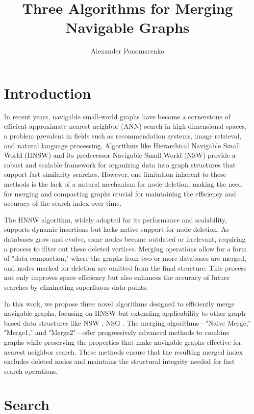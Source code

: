 \documentclass{article}
\title{Three Algorithms for Merging Navigable Graphs}
\author[1]{Alexander Ponomarenko}
\date{}
\affil[1]{YugaByte LLC}
\begin{document}
\maketitle

\section{Introduction}
In recent years, navigable small-world graphs have become a cornerstone of efficient approximate nearest neighbor (ANN) search in high-dimensional spaces, a problem prevalent in fields such as recommendation systems, image retrieval, and natural language processing. Algorithms like Hierarchical Navigable Small World (HNSW) \cite{hnsw} and its predecessor Navigable Small World (NSW) \cite{nsw2011,nsw2012,nsw2014} provide a robust and scalable framework for organizing data into graph structures that support fast similarity searches. However, one limitation inherent to these methods is the lack of a natural mechanism for node deletion, making the need for merging and compacting graphs crucial for maintaining the efficiency and accuracy of the search index over time.

The HNSW algorithm, widely adopted for its performance and scalability, supports dynamic insertions but lacks native support for node deletion. As databases grow and evolve, some nodes become outdated or irrelevant, requiring a process to filter out these deleted vertices. Merging operations allow for a form of "data compaction," where the graphs from two or more databases are merged, and nodes marked for deletion are omitted from the final structure. This process not only improves space efficiency but also enhances the accuracy of future searches by eliminating superfluous data points.

In this work, we propose three novel algorithms designed to efficiently merge navigable graphs, focusing on HNSW but extending applicability to other graph-based data structures like NSW \cite{nsw2011}, NSG \cite{NSG}. The merging algorithms—"Naive Merge," "Merge1," and "Merge2"—offer progressively advanced methods to combine graphs while preserving the properties that make navigable graphs effective for nearest neighbor search. These methods ensure that the resulting merged index excludes deleted nodes and maintains the structural integrity needed for fast search operations.

\section {Search}
\end{document}
